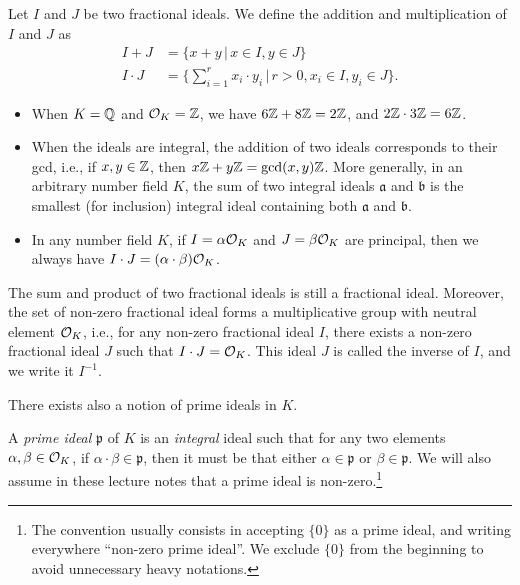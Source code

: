 \begin{definition}
Let $I$ and $J$ be two fractional ideals. We define the addition and multiplication of $I$ and $J$ as
\begin{align*}
I + J &= \{x + y \,|\, x \in I, y \in J\} \\
I \cdot J &= \{ \sum_{i = 1}^r x_i \cdot y_i \,|\, r > 0, x_i \in I, y_i \in J\}.
\end{align*}
\end{definition}

\begin{example}
\begin{itemize}
\item When $K = \mathbb{Q}$ and $\mathcal{O}_K = \mathbb{Z}$, we have $6\mathbb{Z} + 8 \mathbb{Z} = 2\mathbb{Z}$, and $2 \mathbb{Z} \cdot 3 \mathbb{Z} = 6 \mathbb{Z}$.
\item When the ideals are integral, the addition of two ideals corresponds to their gcd, i.e., if $x, y \in \mathbb{Z}$, then $x \mathbb{Z} + y \mathbb{Z} = \gcd(x,y) \mathbb{Z}$. More generally, in an arbitrary number field $K$, the sum of two integral ideals $\mathfrak{a}$ and $\mathfrak{b}$ is the smallest (for inclusion) integral ideal containing both $\mathfrak{a}$ and $\mathfrak{b}$.
\item In any number field $K$, if $I = \alpha \mathcal{O}_K$ and $J = \beta \mathcal{O}_K$ are principal, then we always have $I\cdot J = (\alpha \cdot \beta)\mathcal{O}_K$.
\end{itemize}
\end{example}

\begin{lemma}
The sum and product of two fractional ideals is still a fractional ideal. Moreover, the set of non-zero fractional ideal forms a multiplicative group with neutral element $\mathcal{O}_K$, i.e., for any non-zero fractional ideal $I$, there exists a non-zero fractional ideal $J$ such that $I \cdot J = \mathcal{O}_K$. This ideal $J$ is called the inverse of $I$, and we write it $I^{-1}$.
\end{lemma}

There exists also a notion of prime ideals in $K$.

\begin{definition}
A \emph{prime ideal} $\mathfrak{p}$ of $K$ is an \emph{integral} ideal such that for any two elements $\alpha, \beta \in \mathcal{O}_K$, if $\alpha \cdot \beta \in \mathfrak{p}$, then it must be that either $\alpha \in \mathfrak{p}$ or $\beta \in \mathfrak{p}$.
We will also assume in these lecture notes that a prime ideal is non-zero.\footnote{The convention usually consists in accepting $\{0\}$ as a prime ideal, and writing everywhere ``non-zero prime ideal''. We exclude $\{0\}$ from the beginning to avoid unnecessary heavy notations.}
\end{definition}

